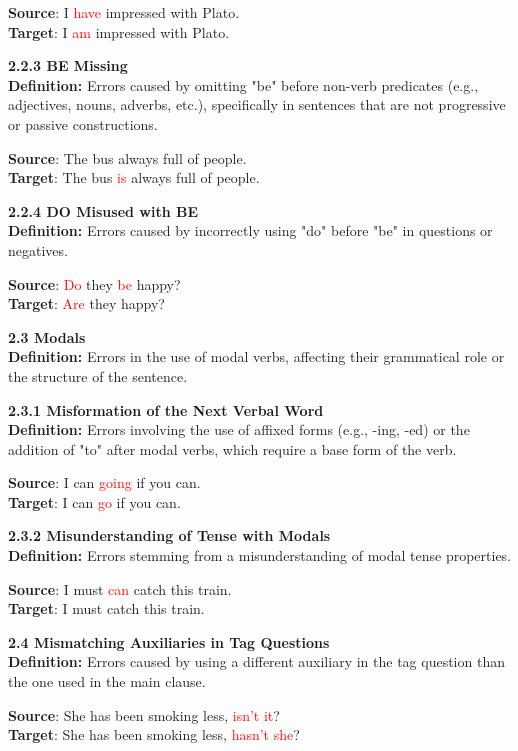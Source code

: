 \begin{tcolorbox}[breakable]
\textbf{Source}: I \textcolor{red}{have} impressed with Plato. \\
\textbf{Target}: I \textcolor{red}{am} impressed with Plato.


\noindent \textbf{2.2.3 BE Missing}\\
\textbf{Definition:} Errors caused by omitting "be" before non-verb predicates (e.g., adjectives, nouns, adverbs, etc.), specifically in sentences that are not progressive or passive constructions.


\textbf{Source}: The bus always full of people. \\
\textbf{Target}: The bus \textcolor{red}{is} always full of people.


\noindent \textbf{2.2.4 DO Misused with BE}\\
\textbf{Definition:} Errors caused by incorrectly using "do" before "be" in questions or negatives.


\textbf{Source}: \textcolor{red}{Do} they \textcolor{red}{be} happy? \\
\textbf{Target}: \textcolor{red}{Are} they happy?


\noindent \textbf{2.3 Modals}\\
\textbf{Definition:} Errors in the use of modal verbs, affecting their grammatical role or the structure of the sentence.

\noindent \textbf{2.3.1 Misformation of the Next Verbal Word}\\
\textbf{Definition:} Errors involving the use of affixed forms (e.g., -ing, -ed) or the addition of "to" after modal verbs, which require a base form of the verb.


\textbf{Source}: I can \textcolor{red}{going} if you can. \\
\textbf{Target}: I can \textcolor{red}{go} if you can.


\noindent \textbf{2.3.2 Misunderstanding of Tense with Modals}\\
\textbf{Definition:} Errors stemming from a misunderstanding of modal tense properties.


\textbf{Source}: I must \textcolor{red}{can} catch this train. \\
\textbf{Target}: I must catch this train.


\noindent \textbf{2.4 Mismatching Auxiliaries in Tag Questions}\\
\textbf{Definition:} Errors caused by using a different auxiliary in the tag question than the one used in the main clause.


\textbf{Source}: She has been smoking less, \textcolor{red}{isn’t it}? \\
\textbf{Target}: She has been smoking less, \textcolor{red}{hasn’t she}?



\end{tcolorbox}
